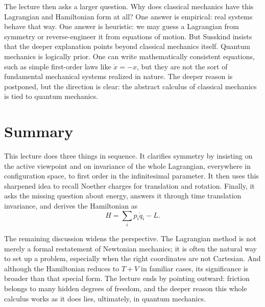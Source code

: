 The lecture then asks a larger question. Why does classical mechanics have this Lagrangian and Hamiltonian form at all? One answer is empirical: real systems behave that way. One answer is heuristic: we may guess a Lagrangian from symmetry or reverse-engineer it from equations of motion. But Susskind insists that the deeper explanation points beyond classical mechanics itself. Quantum mechanics is logically prior. One can write mathematically consistent equations, such as simple first-order laws like \(\dot x=-x\), but they are not the sort of fundamental mechanical systems realized in nature. The deeper reason is postponed, but the direction is clear: the abstract calculus of classical mechanics is tied to quantum mechanics.

\section{Summary}

This lecture does three things in sequence. It clarifies symmetry by insisting on the active viewpoint and on invariance of the whole Lagrangian, everywhere in configuration space, to first order in the infinitesimal parameter. It then uses this sharpened idea to recall Noether charges for translation and rotation. Finally, it asks the missing question about energy, answers it through time translation invariance, and derives the Hamiltonian as
\[
H=\sum_i p_i\dot q_i-L.
\]

The remaining discussion widens the perspective. The Lagrangian method is not merely a formal restatement of Newtonian mechanics; it is often the natural way to set up a problem, especially when the right coordinates are not Cartesian. And although the Hamiltonian reduces to \(T+V\) in familiar cases, its significance is broader than that special form. The lecture ends by pointing outward: friction belongs to many hidden degrees of freedom, and the deeper reason this whole calculus works as it does lies, ultimately, in quantum mechanics.